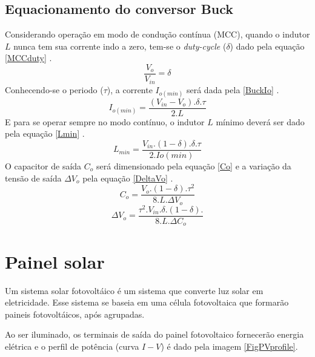 \subsection{Equacionamento do conversor Buck}
Considerando operação em modo de condução contínua (MCC), quando o indutor $L$ nunca tem sua corrente indo a zero, tem-se o \textit{duty-cycle} ($\delta$) dado pela equação \ref{MCCduty} \cite{pomilio}.
\begin{equation}
    \frac{V_o}{V_{in}} = \delta
    \label{MCCduty}
\end{equation}
Conhecendo-se o periodo ($\tau$), a corrente $I_{o(min)}$ será dada pela \ref{BuckIo} \cite{pomilio}.
\begin{equation}
    I_{o(min)}=\frac{(V_{in}-V_o).\delta.\tau}{2.L}
    \label{BuckIo}
\end{equation}
E para se operar sempre no modo contínuo, o indutor $L$ mínimo deverá ser dado pela equação \ref{Lmin} \cite{pomilio}.
\begin{equation}
    L_{min}=\frac{V_{in}.(1-\delta).\delta.\tau}{2.I{o(min)}}
    \label{Lmin}
\end{equation}
O capacitor de saída $C_o$ será dimensionado pela equação \ref{Co} e a variação da tensão de saída $\Delta V_o$ pela equação \ref{DeltaVo} \cite{pomilio}.
\begin{equation}
    C_{o}=\frac{V_o.(1-\delta).\tau^2}{8.L.\Delta V_o}
    \label{Co}
\end{equation}
\begin{equation}
    \Delta V_{o}=\frac{\tau^2.V_{in}.\delta.(1-\delta).}{8.L.\Delta C_o}
    \label{DeltaVo}
\end{equation}
\section{Painel solar}
\par Um sistema solar fotovoltáico é um sistema que converte luz solar em eletricidade. Esse sistema se baseia em uma célula fotovoltaica que formarão paineis fotovoltáicos, após agrupadas. 
\par Ao ser iluminado, os terminais de saída do painel fotovoltaico fornecerão energia elétrica e o perfil de potência (curva $I-V$) é dado pela imagem \ref{FigPVprofile}.

